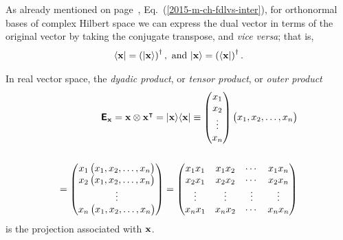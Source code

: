 As already mentioned on page~\pageref{2015-m-ch-fdlvs-inter}, Eq.~(\ref{2015-m-ch-fdlvs-inter}), for orthonormal bases of complex Hilbert space
we can express the dual vector in terms of the original vector by
taking the conjugate transpose, and {\em vice versa}; that is,
\begin{equation}
\begin{split}
\langle {\bf x} \vert = \left(\vert {\bf x}\rangle \right)^\dagger,
\textrm{ and }
\vert {\bf x}\rangle  = \left(\langle {\bf x}\vert\right)^\dagger.
\end{split}
\end{equation}

In real vector space, the {\em dyadic product}, or {\em tensor product}, or {\em outer product}
\begin{equation}
\begin{split}
\textsf{\textbf{E}}_{\bf x} = {\bf x} \otimes {\bf x}^\intercal  = \vert{\bf x}\rangle \langle {\bf x}\vert
\equiv
\begin{pmatrix}
x_1\\
x_2\\
\vdots \\
x_n
\end{pmatrix}
\begin{pmatrix}x_1,x_2,\ldots ,x_n\end{pmatrix}\\
\\
=
\begin{pmatrix}
x_1\begin{pmatrix}x_1,x_2,\ldots ,x_n\end{pmatrix}\\
x_2\begin{pmatrix}x_1,x_2,\ldots ,x_n\end{pmatrix}\\
\vdots  \\
x_n\begin{pmatrix}x_1,x_2,\ldots ,x_n \end{pmatrix}
\end{pmatrix}
=
\begin{pmatrix}
x_1x_1&x_1x_2& \cdots&x_1x_n\\
x_2x_1&x_2x_2& \cdots&x_2x_n\\
\vdots & \vdots & \vdots &\vdots \\
x_nx_1&x_nx_2& \cdots&x_nx_n
\end{pmatrix}
\end{split}
\end{equation}
is the projection
associated with ${\bf x}$.

